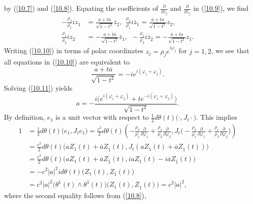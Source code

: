 \documentclass{amsart}
\theoremstyle{Corollary}
\numberwithin{equation}{section}
\begin{document}
by (\ref{10.7}) and (\ref{10.8}). 
Equating the coefficients of $\frac{\partial}{\partial z_j}$ and $\frac{\partial}{\partial \overline{z}_j}$ 
in (\ref{10.9}), we find 
\begin{equation}\label{10.10}
\begin{split}
-\frac{\rho_2}{\rho_1}iz_1&=\frac{a+t\overline{a}}{\sqrt{1-t^2}}\overline{z}_2,~~
\frac{\rho_2}{\rho_1}i\overline{z}_1=\frac{\overline{a}+ta}{\sqrt{1-t^2}}z_2,\\
\frac{\rho_1}{\rho_2}iz_2&=-\frac{a+t\overline{a}}{\sqrt{1-t^2}}\overline{z}_1,~~
-\frac{\rho_1}{\rho_2}i\overline{z}_2=-\frac{\overline{a}+ta}{\sqrt{1-t^2}}z_1.
\end{split}
\end{equation}
Writing (\ref{10.10}) in terms of polar coordinates $z_j=\rho_j e^{i\varphi_j}$ 
for $j=1,2$, 
we see that all equations in (\ref{10.10})
are equivalent to 
\begin{equation}\label{10.11}
\frac{a+t\overline{a}}{\sqrt{1-t^2}}=-ie^{i(\varphi_1+\varphi_2)}. 
\end{equation}
Solving (\ref{10.11}) yields 
\begin{equation}\label{10.12}
a=-\frac{i\big(e^{i(\varphi_1+\varphi_2)}+te^{-i(\varphi_1+\varphi_2)}\big)}{\sqrt{1-t^2}}.
\end{equation}
By definition, $e_1$ is a unit vector with respect to $\frac{1}{2}d\theta(t)\big(\cdot, J_t\cdot\big)$. 
This implies 
\begin{equation*}
\begin{split}
1&=\frac{1}{2}d\theta(t)\big(e_1,J_te_1\big)=\frac{c^2}{2}d\theta(t)\left(
-\frac{\rho_2}{\rho_1}\frac{\partial}{\partial\varphi_1}+\frac{\rho_1}{\rho_2}\frac{\partial}{\partial\varphi_2},
J_t\Big(-\frac{\rho_2}{\rho_1}\frac{\partial}{\partial\varphi_1}+\frac{\rho_1}{\rho_2}\frac{\partial}{\partial\varphi_2}\Big)\right)\\
&=\frac{c^2}{2}d\theta(t)\big(aZ_1(t)+\overline{a}Z_{\overline{1}}(t), 
J_t(aZ_1(t)+\overline{a}Z_{\overline{1}}(t))\big)\\
&=\frac{c^2}{2}d\theta(t)\big(aZ_1(t)+\overline{a}Z_{\overline{1}}(t), 
iaZ_1(t)-i\overline{a}Z_{\overline{1}}(t)\big)\\
&=-c^2|a|^2id\theta(t)\big(Z_1(t),Z_{\overline{1}}(t)\big)\\
&=c^2|a|^2\big(\theta^1(t)\wedge\theta^{\overline{1}}(t)\big)\big(Z_1(t),Z_{\overline{1}}(t)\big)=c^2|a|^2,
\end{split}
\end{equation*}
where the second equality follows from (\ref{10.8}), 
\end{document}
